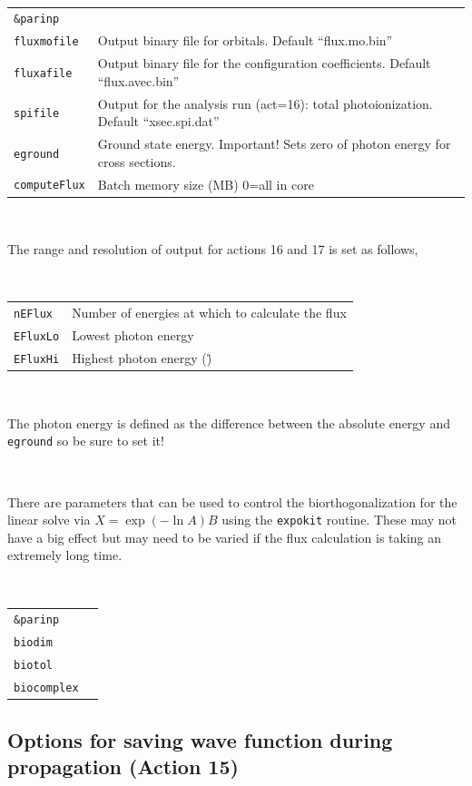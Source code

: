 \documentclass[10pt,leqno, oneside]{book}
\begin{document}
\

{\footnotesize
\begin{tabular}{ll}
\verb#&parinp# \\
\verb#fluxmofile#  &  Output binary file for orbitals.  Default ``flux.mo.bin'' \\
\verb#fluxafile#  &  Output binary file for the configuration coefficients.  Default ``flux.avec.bin'' \\
\verb#spifile#  &  Output for the analysis run (act=16): total photoionization.  Default ``xsec.spi.dat'' \\
\verb#eground# & Ground state energy.  Important!  Sets zero of photon energy for cross sections. \\
\verb#computeFlux#  & Batch memory size (MB)  0=all in core\\
\end{tabular}}

\

The range and resolution of output for actions 16 and 17 is set as follows,

\

{\footnotesize
\begin{tabular}{ll}
\verb#nEFlux#  & Number of energies at which to calculate the flux\\
\verb#EFluxLo#  & Lowest photon energy \\
\verb#EFluxHi#  & Highest photon energy (\") \\
\end{tabular}}

\

The photon energy is defined as the difference between the absolute energy and \verb#eground# so be sure to set it!

\

There are parameters that can be used to control the biorthogonalization for the linear solve via $X=\exp ( -\ln A )B$ using the \verb#expokit# routine.
These may not have a big effect but may need to be varied if the flux calculation is taking an extremely long time. 

\

{\footnotesize
\begin{tabular}{ll}
\verb#&parinp# & \\
\verb#biodim# & \\
\verb#biotol# & \\
\verb#biocomplex# & \\
\end{tabular}}

\subsection{Options for saving wave function during propagation (Action 15) \label{act15sect}}
\end{document}
